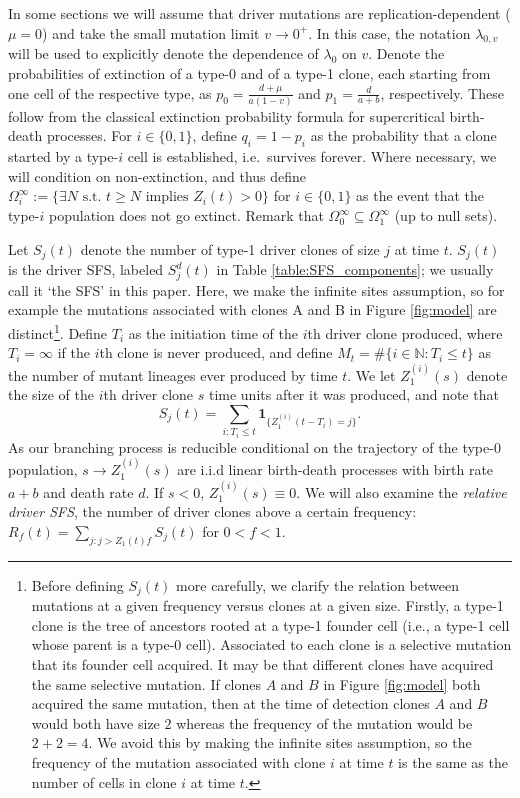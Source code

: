 \documentclass{article}
\numberwithin{equation}{section}
\begin{document}
In some sections we will assume that driver mutations are replication-dependent ($\mu=0$) and take the small mutation limit $v\to 0^+$. In this case, the notation $\lambda_{0,v}$ will be used to explicitly denote the dependence of $\lambda_0$ on $v$. Denote the probabilities of extinction of a type-0 and of a type-1 clone, each starting from one cell of the respective type, as $p_0=\frac{d+\mu}{a(1-v)}$ and $p_1=\frac{d}{a+b}$, respectively.  These follow from the classical extinction probability formula for supercritical birth-death processes.  For $i\in \{0,1\}$, define $q_i=1-p_i$ as the probability that a clone started by a type-$i$ cell is established, i.e.~survives forever. Where necessary, we will condition on non-extinction, and thus define $\Omega_i^\infty:=\{\exists N\text{ s.t. }t\geq N\text{ implies }Z_i(t)>0\}$ for $i\in \{0,1\}$ as the event that the type-$i$ population does not go extinct. Remark that $ \Omega_0^\infty\subseteq \Omega_1^\infty$ (up to null sets).

Let $S_j(t)$ denote the number of type-1 driver clones of size $j$ at time $t$. $S_j(t)$ is the driver SFS, labeled $S_j^d(t)$ in Table \ref{table:SFS_components}; we usually call it `the SFS' in this paper. Here, we make the infinite sites assumption, so for example the mutations associated with clones A and B in Figure \ref{fig:model} are distinct\footnote{Before defining $S_j(t)$ more carefully, we clarify the relation between mutations at a given frequency versus clones at a given size. Firstly, a type-1 clone is the tree of ancestors rooted at a type-1 founder cell (i.e., a type-1 cell whose parent is a type-0 cell). Associated to each clone is a selective mutation that its founder cell acquired. It may be that different clones have acquired the same selective mutation. If clones $A$ and $B$ in Figure \ref{fig:model} both acquired the same mutation, then at the time of detection clones $A$ and $B$ would both have size $2$ whereas the frequency of the mutation would be $2+2=4$. We avoid this by making the infinite sites assumption, so the frequency of the mutation associated with clone $i$ at time $t$ is the same as the number of cells in clone $i$ at time $t$.}. Define $T_i$ as the initiation time of the $i$th driver clone produced, where $T_i=\infty$ if the $i$th clone is never produced, and define $M_t=\#\{i\in\mathbb{N}:T_i\leq t\}$ as the number of mutant lineages ever produced by time $t$. 
We let $Z_1^{(i)}(s)$ denote the size of the $i$th driver clone $s$ time units after it was produced, and note that 
\[
S_j(t)=\sum_{i:T_i\leq t} \mathbf{1}_{\{Z_{1}^{(i)}(t-T_i)=j\}}.
\]
As our branching process is reducible conditional on the trajectory of the type-0 population, $s\to Z_1^{(i)}(s)$ are i.i.d linear birth-death processes with birth rate $a+b$ and death rate $d$. If $s<0$, $Z_1^{(i)}(s)\equiv 0$.
We will also examine the {\it relative driver SFS}, the number of driver clones above a certain frequency: $R_f(t)=\sum_{j:j>Z_1(t)f}S_j(t)$ for $0<f<1$.
\end{document}
